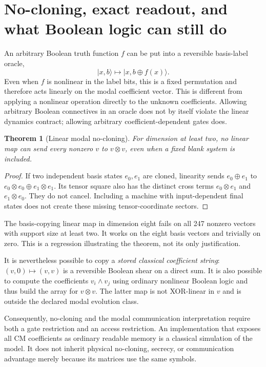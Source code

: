 \documentclass[11pt,a4paper]{article}
\newtheorem{theorem}{Theorem}[section]
\theoremstyle{definition}\newtheorem{definition}[theorem]{Definition}
\newcommand{\ket}[1]{\lvert #1\rangle}
\begin{document}
\section{No-cloning, exact readout, and what Boolean logic can still do}
An arbitrary Boolean truth function $f$ can be put into a reversible basis-label oracle,
\[
 \ket{x,b}\longmapsto\ket{x,b\oplus f(x)}.
\]
Even when $f$ is nonlinear in the label bits, this is a fixed permutation and therefore acts linearly on the modal coefficient vector. This is different from applying a nonlinear operation directly to the unknown coefficients. Allowing arbitrary Boolean connectives in an oracle does not by itself violate the linear dynamics contract; allowing arbitrary coefficient-dependent gates does.

\begin{theorem}[Linear modal no-cloning]
For dimension at least two, no linear map can send every nonzero $v$ to $v\otimes v$, even when a fixed blank system is included.
\end{theorem}
\begin{proof}
If two independent basis states $e_0,e_1$ are cloned, linearity sends $e_0\oplus e_1$ to $e_0\otimes e_0\oplus e_1\otimes e_1$. Its tensor square also has the distinct cross terms $e_0\otimes e_1$ and $e_1\otimes e_0$. They do not cancel. Including a machine with input-dependent final states does not create these missing tensor-coordinate sectors.
\end{proof}
The basis-copying linear map in dimension eight fails on all 247 nonzero vectors with support size at least two. It works on the eight basis vectors and trivially on zero. This is a regression illustrating the theorem, not its only justification.

It is nevertheless possible to copy a \emph{stored classical coefficient string}: $(v,0)\mapsto(v,v)$ is a reversible Boolean shear on a direct sum. It is also possible to compute the coefficients $v_i\wedge v_j$ using ordinary nonlinear Boolean logic and thus build the array for $v\otimes v$. The latter map is not XOR-linear in $v$ and is outside the declared modal evolution class.

Consequently, no-cloning and the modal communication interpretation require both a gate restriction and an access restriction. An implementation that exposes all CM coefficients as ordinary readable memory is a classical simulation of the model. It does not inherit physical no-cloning, secrecy, or communication advantage merely because its matrices use the same symbols.
\end{document}
